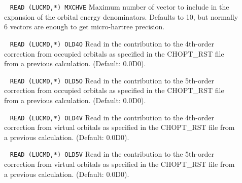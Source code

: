 \begin{description}
\item[]\verb| |\newline
\verb|READ (LUCMD,*) MXCHVE|\newline
        Maximum number of vector to include in the expansion of the
        orbital energy denominators. Defaults to 10, but normally 
        6 vectors are enough to get micro-hartree precision.
%
\item[] \verb| |\newline
\verb|READ (LUCMD,*) OLD4O|\newline
        Read in the contribution to the 4th-order correction from
        occupied orbitals as specified in the CHOPT\_RST file from a
        previous calculation. (Default: 0.0D0).
%
\item[] \verb| |\newline
\verb|READ (LUCMD,*) OLD5O|\newline
        Read in the contribution to the 5th-order correction from
        occupied orbitals as specified in the CHOPT\_RST file from a
        previous calculation. (Default: 0.0D0).
%
\item[] \verb| |\newline
\verb|READ (LUCMD,*) OLD4V|\newline
        Read in the contribution to the 4th-order correction from
        virtual orbitals as specified in the CHOPT\_RST file from a
        previous calculation. (Default: 0.0D0).
%
\item[] \verb| |\newline
\verb|READ (LUCMD,*) OLD5V|\newline
        Read in the contribution to the 5th-order correction from
        virtual orbitals as specified in the CHOPT\_RST file from a
        previous calculation. (Default: 0.0D0).
%


\end{description}

